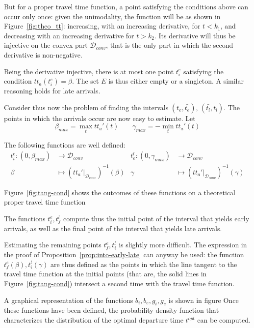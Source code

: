 But for a proper travel time function,
a point satisfying the conditions above can occur only once:
given the unimodality,
the function will be as shown in Figure~\ref{fig:theo_tt}: increasing, with an increasing derivative,
for \(t < k_1\), and decreasing with an increasing derivative for \(t > k_2\).
Its derivative will thus be injective on the convex part \(\mathcal{D}_{conv}\),
that is the only part in which the second derivative is non-negative.

Being the derivative injective,
there is at most one point \(t_i^e\) satisfying the condition \(tt_a(t_i^e) = \beta\).
The set \(E\) is thus either empty or a singleton.
A similar reasoning holds for late arrivals.

Consider thus now the problem of finding the intervals \((t_e, \bar{t_e})\), \((\bar{t_l}, t_l)\).
The points in which the arrivals occur are now easy to estimate. Let
\begin{equation*}
  \beta_{max} = \max_t tt_a'(t)\qquad \gamma_{max} = -\min_t tt_a'(t)
\end{equation*}

The following functions are well defined:
\begin{align*}
  t_i^e: (0, \beta_{max}) & \rightarrow \mathcal{D}_{conv}  & t_e^l: (0, \gamma_{max}) & \rightarrow \mathcal{D}_{conv} \\
       \beta & \mapsto (tt_a' |_{\mathcal{D}_{conv}})^{-1}(\beta) & \gamma & \mapsto(tt_a' |_{\mathcal{D}_{conv}})^{-1}(\gamma)
\end{align*}


Figure~\ref{fig:tang-cond} shows the outcomes of these functions on a theoretical proper travel time function

The functions \(t_i^e, t_f^l\) compute thus the initial point of the interval that yields early arrivals,
as well as the final point of the interval that yields late arrivals.

Estimating the remaining points \(t_f^e, t_i^l\) is slightly more difficult.
The expression in the proof of Proposition~\ref{prop:into-early-late} can anyway be used:
the function \(t_f^e(\beta), t_i^l(\gamma)\)
are thus defined as the points in which the line tangent to the travel time function at the initial points
(that are, the solid lines in Figure~\ref{fig:tang-cond})
intersect a second time with the travel time function.


A graphical representation of the functions \(b_i, b_e, g_i, g_e\) is shown in figure
Once these functions have been defined,
the probability density function that characterizes the distribution of the optimal departure time \(t^{opt}\) can be computed.

